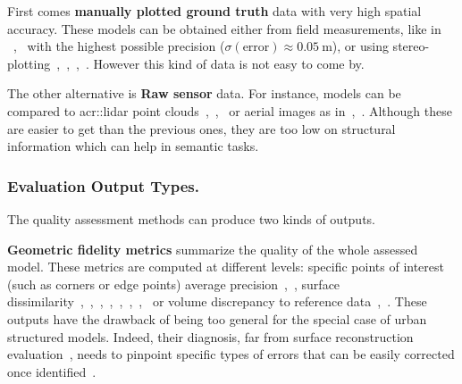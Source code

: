 \documentclass[runningheads]{llncs}
\begin{document}
First comes \textbf{manually plotted ground truth} data with very high spatial accuracy. These models can be obtained either from field measurements, like in ~\cite{dick2004modelling},~\cite{Kaartinen2005} with the highest possible precision ($\sigma(\text{error}) \approx \SI{0.05}{\meter}$), or using stereo-plotting~\cite{jaynes2003recognition},~\cite{Kaartinen2005},~\cite{zebedin2008fusion},~\cite{Zeng2014}. However this kind of data is not easy to come by.

The other alternative is \textbf{Raw sensor} data. For instance, models can be compared to \acrfull{acr::lidar} point clouds~\cite{Akca2010},~\cite{lafarge2012creating},~\cite{li2016boxfitting} or aerial images as in~\cite{boudet2006supervised},~\cite{Michelin2013}. Although these are easier to get than the previous ones, they are too low on structural information which can help in semantic tasks.

\subsubsection{Evaluation Output Types.}
The quality assessment methods can produce two kinds of outputs.

\textbf{Geometric fidelity metrics} summarize the quality of the whole assessed model. These metrics are computed at different levels: specific points of interest (such as corners or edge points) average precision~\cite{vogtle2003quality},~\cite{Kaartinen2005}, surface dissimilarity~\cite{jaynes2003recognition},~\cite{dick2004modelling},~\cite{Kaartinen2005},~\cite{zebedin2008fusion},~\cite{lafarge2012creating},~\cite{Zeng2014},~\cite{li2016boxfitting},~\cite{nan2017polyfit} or volume discrepancy to reference data~\cite{jaynes2003recognition},~\cite{Zeng2014}. These outputs have the drawback of being too general for the special case of urban structured models. Indeed, their diagnosis, far from surface reconstruction evaluation~\cite{berger2013benchmark}, needs to pinpoint specific types of errors that can be easily corrected once identified~\cite{OudeElberink2010}.
\end{document}
